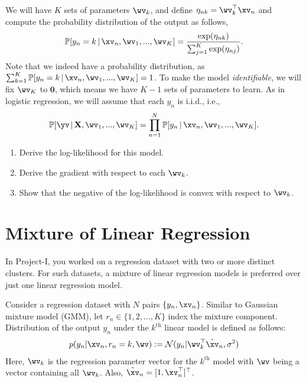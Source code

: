 \documentclass{../tex_import/ETHuebung_english}
\begin{document}
We will have $K$ sets of parameters $\wv_k$, and define $\eta_{nk} = \wv_k^\top\xv_n$ and compute the probability distribution of the output as follows,
\[	\mathbb{P}[y_n = k \,|\, \xv_n, \wv_1, ..., \wv_K] = \frac{\exp(\eta_{nk})}{\sum_{j=1}^K \exp(\eta_{nj})}.	\]
Note that we indeed have a probability distribution, as $\sum_{k=1}^K \mathbb{P}[y_n = k \,|\, \xv_n, \wv_1, ..., \wv_K] = 1$. To make the model \emph{identifiable}, we will fix $\wv_K$ to $\mathbf{0}$, which means we have $K-1$ sets of parameters to learn. As in logistic regression, we will assume that each $y_n$ is i.i.d., i.e.,
\[	\mathbb{P}[\yv \,|\, \mathbf{X}, \wv_1, ..., \wv_K] = \prod_{n=1}^N	\mathbb{P}[y_n \,|\, \xv_n, \wv_1, ..., \wv_K]. \]

\begin{enumerate}
	\item Derive the log-likelihood for this model.
	\item Derive the gradient with respect to each $\wv_k$.
	\item Show that the negative of the log-likelihood is convex with respect to $\wv_k$.
\end{enumerate}


\section{Mixture of Linear Regression}
In Project-I, you worked on a regression dataset with two or more distinct clusters.
For such datasets, a mixture of linear regression models is preferred over just one linear regression model.

Consider a regression dataset with $N$ pairs $\{ y_n, \xv_n \}$.
Similar to Gaussian mixture model (GMM), let $r_n \in \{ 1, 2, \ldots, K \}$ index the mixture component.
Distribution of the output $y_n$ under the $k^{\text{th}}$ linear model is defined as follows:
\begin{align*}
	p(y_n | \xv_n, r_n = k, \wv) := \mathcal{N} (y_n | \wv_k^\top \tilde{\xv}_n, \sigma^2)
\end{align*}
Here, $ \wv_k $ is the regression parameter vector for the $k^{\text{th}}$ model with $\wv$ being a vector containing all $\wv_k$. Also, $\tilde{\xv}_n = [1, \xv_n^\top]^\top$.
\end{document}

